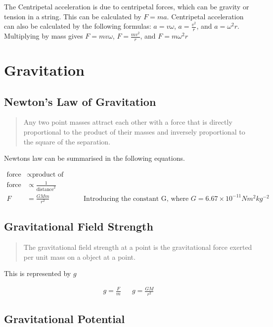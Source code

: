 \documentclass{scrbook}
\begin{document}
	The Centripetal acceleration is due to centripetal forces, which can be gravity or tension in a string. This can be calculated by $F = ma$. Centripetal acceleration can also be calculated by the following formulas: $a = v\omega$, $a = \frac{v^2}{r}$, and $a = \omega ^2 r$. Multiplying by mass gives $F = mv\omega$, $F = \frac{mv^2}{r}$, and $F = m\omega^2r$

\section{Gravitation}

\subsection{Newton's Law of Gravitation}

	\begin{quote}
		Any two point masses attract each other with a force that is directly proportional to the product of their masses and inversely proportional to the square of the separation.
	\end{quote}

	Newtons law can be summarised in the following equations.
	
	\begin{align*}
	\text{force} &\propto \text{product  of  masses} &
		\\
		\text{force} &\propto \frac{1}{\text{distance}^2} &
		\\
		F &= \frac{GMm}{r^2} & \text{Introducing the constant G, where } G = 6.67\times 10^{-11} Nm^2kg^{-2}
	\end{align*}

\subsection{Gravitational Field Strength}

	\begin{quote}
		The gravitational field strength at a point is the gravitational force exerted per unit mass on a object at a point.
	\end{quote}

	This is represented by $g$

	\begin{align*}g = \frac{F}{m} & & g = \frac{GM}{r^2}\end{align*}
	
\subsection{Gravitational Potential}
\end{document}
